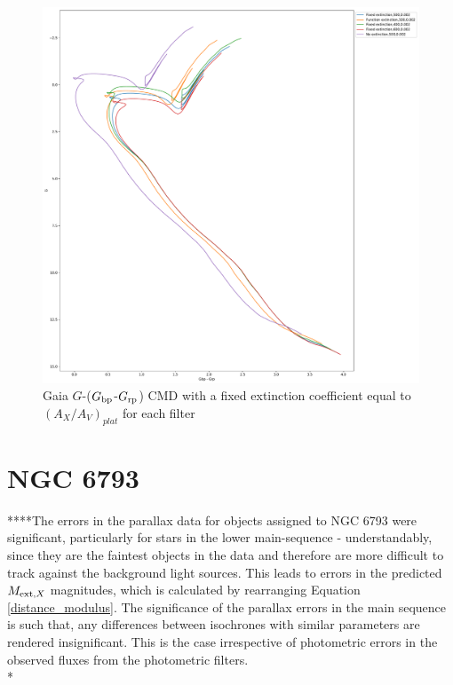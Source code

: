 \documentclass[12pt, a4paper]{report}
\begin{document}
\begin{figure}[h]
\begin{center}
\includegraphics[scale=0.3]{../basti_isochrones_10_13Gyr/Extinction_T50k_FeH0fix_func_G_GbpmGrp_500_400_600_Myr_FeH_0p002_ref_noext_Av_1p0.pdf}
\caption{Gaia $G$-($G_{\textnormal{bp}}$-$G_{\textnormal{rp}}$) CMD with a fixed extinction coefficient equal to $(A_{X}/A_{V})_{plat}$ for each filter}
\label{gaia_isoc_T50k}
\end{center}
\end{figure}

\section{NGC 6793}

****The errors in the parallax data for objects assigned to NGC 6793 were significant, particularly for stars in the lower main-sequence - understandably, since they are the faintest objects in the data and therefore are more difficult to track against the background light sources. This leads to errors in the predicted $M_{\textnormal{ext},X}$ magnitudes, which is calculated by rearranging Equation \ref{distance_modulus}. The significance of the parallax errors in the main sequence is such that, any differences between isochrones with similar parameters are rendered insignificant. This is the case irrespective of photometric errors in the observed fluxes from the photometric filters.\\*
\end{document}
